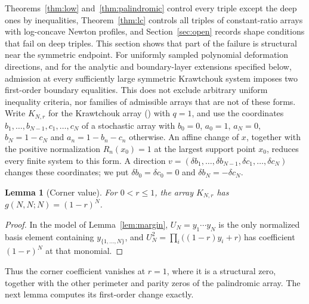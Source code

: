 \documentclass[twoside,10pt]{article}
\numberwithin{equation}{section}
\theoremstyle{slbody}
\newtheorem{lemma}[theorem]{Lemma}
\theoremstyle{definition}
\theoremstyle{remark}
\renewcommand{\eqref}[1]{\textup{{\normalfont(\oldstylenums{\ref{#1}}}\normalfont)}}
\begin{document}
Theorems~\ref{thm:low} and~\ref{thm:palindromic} control every triple except the deep ones by inequalities, Theorem~\ref{thm:lc} controls all triples of constant-ratio arrays with log-concave Newton profiles, and Section~\ref{sec:open} records shape conditions that fail on deep triples. This section shows that part of the failure is structural near the symmetric endpoint. For uniformly sampled polynomial deformation directions, and for the analytic and boundary-layer extensions specified below, admission at every sufficiently large symmetric Krawtchouk system imposes two first-order boundary equalities. This does not exclude arbitrary uniform inequality criteria, nor families of admissible arrays that are not of these forms. Write $K_{N,r}$ for the Krawtchouk array \eqref{eq:parameters} with $q=1$, and use the coordinates $b_1,\ldots,b_{N-1},c_1,\ldots,c_N$ of a stochastic array with $b_0=0$, $a_0=1$, $a_N=0$, $b_N=1-c_N$ and $a_n=1-b_n-c_n$ otherwise. An affine change of $x$, together with the positive normalization $R_n(x_0)=1$ at the largest support point $x_0$, reduces every finite system to this form. A direction $v=(\delta b_1,\ldots,\delta b_{N-1},\delta c_1,\ldots,\delta c_N)$ changes these coordinates; we put $\delta b_0=\delta c_0=0$ and $\delta b_N=-\delta c_N$.

\begin{lemma}[Corner value]\label{lem:corner-value}
For $0<r\leq1$, the array $K_{N,r}$ has $g(N,N;N)=(1-r)^N$.
\end{lemma}
\begin{proof}
In the model of Lemma~\ref{lem:margin}, $U_N=y_1\cdots y_N$ is the only normalized basis element containing $y_{\{1,\ldots,N\}}$, and $U_N^2=\prod_i\bigl((1-r)y_i+r\bigr)$ has coefficient $(1-r)^N$ at that monomial.
\end{proof}

Thus the corner coefficient vanishes at $r=1$, where it is a structural zero, together with the other perimeter and parity zeros of the palindromic array. The next lemma computes its first-order change exactly.
\end{document}
